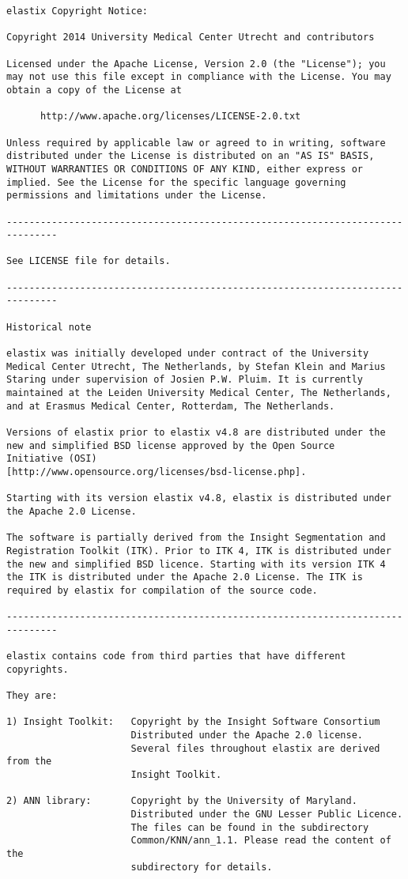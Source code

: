 \documentclass[]{report}
\begin{document}
\small
\begin{verbatim}
elastix Copyright Notice:

Copyright 2014 University Medical Center Utrecht and contributors

Licensed under the Apache License, Version 2.0 (the "License"); you
may not use this file except in compliance with the License. You may
obtain a copy of the License at

      http://www.apache.org/licenses/LICENSE-2.0.txt

Unless required by applicable law or agreed to in writing, software
distributed under the License is distributed on an "AS IS" BASIS,
WITHOUT WARRANTIES OR CONDITIONS OF ANY KIND, either express or
implied. See the License for the specific language governing
permissions and limitations under the License.

-------------------------------------------------------------------------------

See LICENSE file for details.

-------------------------------------------------------------------------------

Historical note

elastix was initially developed under contract of the University
Medical Center Utrecht, The Netherlands, by Stefan Klein and Marius
Staring under supervision of Josien P.W. Pluim. It is currently
maintained at the Leiden University Medical Center, The Netherlands,
and at Erasmus Medical Center, Rotterdam, The Netherlands.

Versions of elastix prior to elastix v4.8 are distributed under the
new and simplified BSD license approved by the Open Source
Initiative (OSI)
[http://www.opensource.org/licenses/bsd-license.php].

Starting with its version elastix v4.8, elastix is distributed under
the Apache 2.0 License.

The software is partially derived from the Insight Segmentation and
Registration Toolkit (ITK). Prior to ITK 4, ITK is distributed under
the new and simplified BSD licence. Starting with its version ITK 4
the ITK is distributed under the Apache 2.0 License. The ITK is
required by elastix for compilation of the source code.

-------------------------------------------------------------------------------

elastix contains code from third parties that have different
copyrights.

They are:

1) Insight Toolkit:   Copyright by the Insight Software Consortium
                      Distributed under the Apache 2.0 license.
                      Several files throughout elastix are derived from the
                      Insight Toolkit.

2) ANN library:       Copyright by the University of Maryland.
                      Distributed under the GNU Lesser Public Licence.
                      The files can be found in the subdirectory
                      Common/KNN/ann_1.1. Please read the content of the
                      subdirectory for details.
\end{verbatim}
\normalsize
\end{document}
